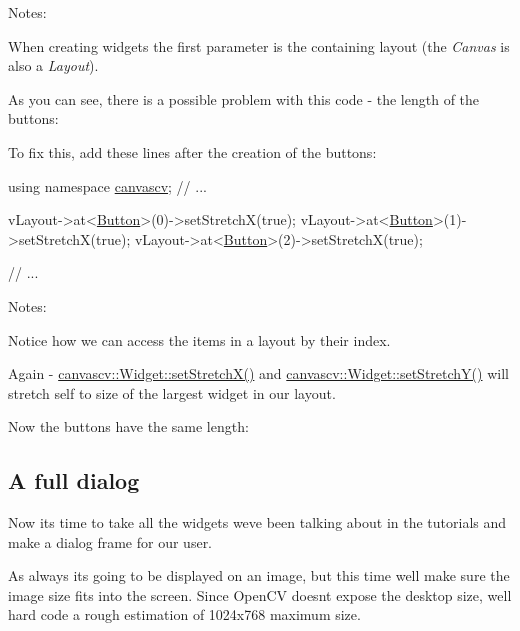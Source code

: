  Notes\+:
\begin{DoxyItemize}
\item When creating widgets the first parameter is the containing layout (the {\itshape Canvas} is also a {\itshape Layout}).
\item As you can see, there is a possible problem with this code -\/ the length of the buttons\+: 
\item To fix this, add these lines after the creation of the buttons\+: 
\begin{DoxyCode}
\textcolor{keyword}{using namespace }\hyperlink{namespacecanvascv}{canvascv};
\textcolor{comment}{// ...}

vLayout->at<\hyperlink{classcanvascv_1_1Button}{Button}>(0)->setStretchX(\textcolor{keyword}{true});
vLayout->at<\hyperlink{classcanvascv_1_1Button}{Button}>(1)->setStretchX(\textcolor{keyword}{true});
vLayout->at<\hyperlink{classcanvascv_1_1Button}{Button}>(2)->setStretchX(\textcolor{keyword}{true});

\textcolor{comment}{// ...}
\end{DoxyCode}
 Notes\+:
\item Notice how we can access the items in a layout by their index.
\item Again -\/ \hyperlink{classcanvascv_1_1Widget_a7cdddebd755c499712793f727a057733}{canvascv\+::\+Widget\+::set\+Stretch\+X()} and \hyperlink{classcanvascv_1_1Widget_a3ef50b76d33c332cea4e632346b6df33}{canvascv\+::\+Widget\+::set\+Stretch\+Y()} will stretch self to size of the largest widget in our layout.
\item Now the buttons have the same length\+:  ~\newline

\end{DoxyItemize}\hypertarget{tutlayouts_layouts_s3}{}\subsection{A full dialog}\label{tutlayouts_layouts_s3}
Now it\textquotesingle{}s time to take all the widgets we\textquotesingle{}ve been talking about in the tutorials and make a dialog frame for our user.

As always it\textquotesingle{}s going to be displayed on an image, but this time we\textquotesingle{}ll make sure the image size fits into the screen. Since Open\+CV doesn\textquotesingle{}t expose the desktop size, we\textquotesingle{}ll hard code a rough estimation of 1024x768 maximum size.


